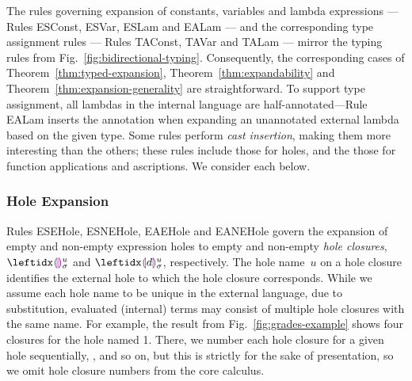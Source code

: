 The rules governing expansion of constants, variables and lambda expressions
--- Rules {ESConst}, {ESVar}, {ESLam} and {EALam}
--- and the corresponding type assignment rules
--- Rules {TAConst}, {TAVar} and {TALam}
--- mirror the typing rules from Fig.~\ref{fig:bidirectional-typing}.
%
Consequently, the corresponding cases of
Theorem~\ref{thm:typed-expansion}, Theorem~\ref{thm:expandability} and
Theorem~\ref{thm:expansion-generality} are straightforward.
%
To support type assignment, all lambdas in the internal language are
half-annotated---Rule {EALam} inserts the annotation when expanding an
unannotated external lambda based on the given type.
%
Some rules perform \emph{cast insertion}, making them more interesting
than the others; these rules include those for holes, and the those for
function applications and ascriptions.  We consider each below.

\subsubsection{Hole Expansion}\label{sec:hole-expansion} 
Rules {ESEHole}, {ESNEHole}, {EAEHole} and {EANEHole} govern the expansion of empty and non-empty expression holes to empty and non-empty \emph{hole closures}, $\dehole{u}{\sigma}{}$ and $\dhole{\dexp}{u}{\sigma}{}$, respectively. 
%
The hole name~$u$ on a hole closure identifies the external hole to which the hole closure corresponds.
%
While we assume each hole name to be unique in the external language, due to substitution, evaluated (internal) terms may consist of multiple hole closures with the same name.
%
For example, the result from Fig.~\ref{fig:grades-example} shows four closures for the hole named 1.
%
There, we number each hole closure for a given hole sequentially, ,  and so on, but this is strictly for the sake of presentation, so we omit hole closure numbers from the core calculus.


